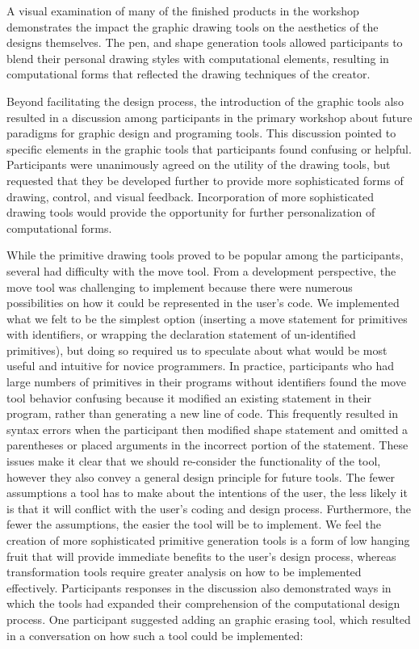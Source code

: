 \documentclass{sigchi}
\begin{document}
A visual examination of many of the finished products in the workshop demonstrates the impact the graphic drawing tools on the aesthetics of the designs themselves. The pen, and shape generation tools allowed participants to blend their personal drawing styles with computational elements, resulting in computational forms that reflected the drawing techniques of the creator. 


Beyond facilitating the design process, the introduction of the graphic tools also resulted in a discussion among participants in the primary workshop about future paradigms for graphic design and programing tools. This discussion pointed to specific elements in the graphic tools that participants found confusing or helpful. Participants were unanimously agreed on the utility of the drawing tools, but requested that they be developed further to provide more sophisticated forms of drawing, control, and visual feedback. Incorporation of more sophisticated drawing tools would provide the opportunity for further personalization of computational forms.

While the primitive drawing tools proved to be popular among the participants, several had difficulty with the move tool. From a development perspective, the move tool was challenging to implement because there were numerous possibilities on how it could be represented in the user's code. We implemented what we felt to be the simplest option (inserting a move statement for primitives with identifiers, or wrapping the declaration statement of un-identified primitives), but doing so required us to speculate about what would be most useful and intuitive for novice programmers. In practice, participants who had large numbers of primitives in their programs without identifiers found the move tool behavior confusing because it modified an existing statement in their program, rather than generating a new line of code. This frequently resulted in syntax errors when the participant then modified shape statement and omitted a parentheses or placed arguments in the incorrect portion of the statement. These issues make it clear that we should re-consider the functionality of the tool, however they also convey a general design principle for future tools. The fewer assumptions a tool has to make about the intentions of the user, the less likely it is that it will conflict with the user's coding and design process. Furthermore, the fewer the assumptions, the easier the tool will be to implement. We feel the creation of more sophisticated primitive generation tools is a form of low hanging fruit that will provide immediate benefits to the user's design process, whereas transformation tools require greater analysis on how to be implemented effectively. Participants responses in the discussion also demonstrated ways in which the tools had expanded their comprehension of the computational design process. One participant suggested adding an graphic erasing tool, which resulted in a conversation on how such a tool could be implemented:
\end{document}
